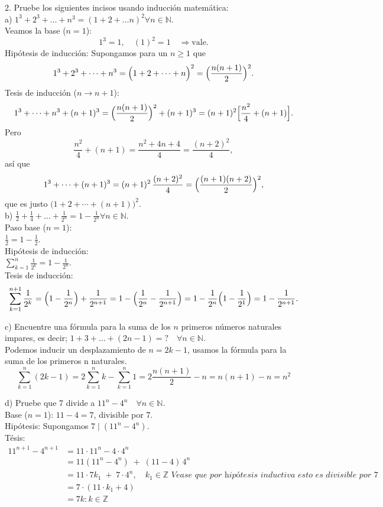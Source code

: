 2. Pruebe los siguientes incisos usando inducción matemática: \\
a) \( 1^{3}+2^{3}+\ldots+n^{3}=(1+2+\ldots n)^{2} \forall n \in \mathbb{N} \). \\
Veamos la base (\(n=1\)): 
\[
     1^{3} = 1,\quad (1)^{2} =1\quad\Longrightarrow\text{vale.}
   \]
Hipótesis de inducción: Supongamos para un \(n\ge1\) que
\[
     1^{3}+2^{3}+\cdots+n^{3} = \Bigl(1+2+\cdots+n\Bigr)^{2}
     =\Bigl(\frac{n(n+1)}{2}\Bigr)^{2}.
   \]
Tesis de inducción (\(n\to n+1\)):
\[
   1^{3}+\cdots+n^{3}+(n+1)^{3}
   =\Bigl(\frac{n(n+1)}{2}\Bigr)^{2}+(n+1)^{3}
   = (n+1)^{2}\Bigl[\frac{n^{2}}{4} + (n+1)\Bigr].
   \]
Pero
\[
   \frac{n^{2}}{4} + (n+1)
   = \frac{n^{2}+4n+4}{4}
   = \frac{(n+2)^{2}}{4},
   \]
así que
\[
   1^{3}+\cdots+(n+1)^{3}
   = (n+1)^{2}\,\frac{(n+2)^{2}}{4}
   = \Bigl(\frac{(n+1)(n+2)}{2}\Bigr)^{2},
   \]
que es justo \(\bigl(1+2+\cdots+(n+1)\bigr)^{2}.\) \\

b) \( \frac{1}{2}+\frac{1}{4}+\ldots+\frac{1}{2^{n}}=1-\frac{1}{2^{n}} \forall n \in \mathbb{N} \). \\

Paso base (\(n=1\)): \\
\(\frac12 = 1-\frac12\). \\
Hipótesis de inducción: \\ 
\(\displaystyle \sum_{k=1}^{n}\frac1{2^{k}}
     = 1 - \frac1{2^{n}}.\) \\
Tesis de inducción:
\[
     \sum_{k=1}^{n+1}\frac1{2^{k}}
     = \Bigl(1 - \frac1{2^{n}}\Bigr) + \frac1{2^{n+1}}
     = 1 - \Bigl(\frac1{2^{n}} - \frac1{2^{n+1}}\Bigr)
     = 1 - \frac{1}{2^n} \Big(1 - \frac{1}{2^1}\Big)
     = 1 - \frac1{2^{n+1}}.
   \]


c) Encuentre una fórmula para la suma de los \( n \) primeros números naturales impares, es decir;
\( 1+3+\ldots+(2 n-1)=? \quad \forall n \in \mathbb{N} \). \\
Podemos inducir un desplazamiento de $n = 2k-1$, usamos la fórmula para la suma de los primeros n naturales. 
\[
\sum_{k=1}^n (2k - 1) = 2 \sum_{k=1}^n k - \sum_{k=1}^n 1 = 2 \frac{n(n+1)}{2} - n = n(n+1) - n = n^2
\]




d) Pruebe que 7 divide a \( 11^{n}-4^{n} \quad \forall n \in \mathbb{N} \). \\
Base (\(n=1\)): \(11-4=7\), divisible por 7. \\
Hipótesis: Supongamos \(7\mid(11^{n}-4^{n})\). \\
Tésis: \\
\begin{align*}
     11^{n+1}-4^{n+1}
     &= 11\cdot11^{n} -4\cdot4^{n} \\
     &= 11(11^{n}-4^{n}) \;+\; (11-4)\,4^{n} \\
     &= 11 \cdot 7k_1 \;+\; 7 \cdot 4^{n}, \quad k_1 \in \mathbb{Z} \textit{ Vease que por hipótesis inductiva esto es divisible por 7} \\
     &= 7 \cdot (11 \cdot k_1 + 4) \\
     &= 7k : k \in \mathbb{Z}
\end{align*}


